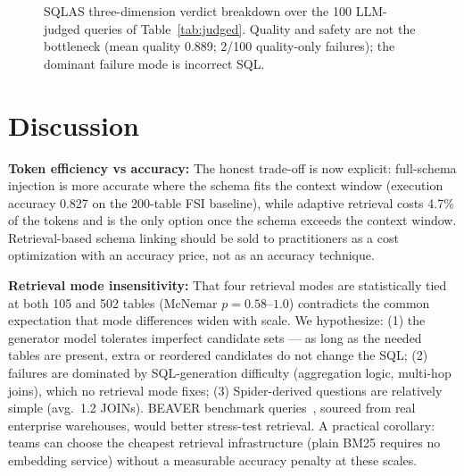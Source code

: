\documentclass[conference]{IEEEtran}
\begin{document}
\begin{figure}[!htb]
\centering
{}
\caption{SQLAS three-dimension verdict breakdown over the 100
LLM-judged queries of Table~\ref{tab:judged}. Quality and safety are
not the bottleneck (mean quality 0.889; 2/100 quality-only failures);
the dominant failure mode is incorrect SQL.}
\label{fig:verdict}
\end{figure}

\section{Discussion}
\label{sec:discussion}

\textbf{Token efficiency vs accuracy:}
The honest trade-off is now explicit: full-schema injection is more
accurate where the schema fits the context window (execution accuracy
0.827 on the 200-table FSI baseline), while adaptive retrieval costs
4.7\% of the tokens and is the only option once the schema exceeds the
context window. Retrieval-based schema linking should be sold to
practitioners as a cost optimization with an accuracy price, not as an
accuracy technique.

\textbf{Retrieval mode insensitivity:}
That four retrieval modes are statistically tied at both 105 and 502
tables (McNemar $p = 0.58$--$1.0$) contradicts the common expectation
that mode differences widen with scale. We hypothesize: (1) the
generator model tolerates imperfect candidate sets --- as long as the
needed tables are present, extra or reordered candidates do not change
the SQL; (2) failures are dominated by SQL-generation difficulty
(aggregation logic, multi-hop joins), which no retrieval mode fixes;
(3) Spider-derived questions are relatively simple (avg.\ 1.2 JOINs).
BEAVER benchmark queries~\cite{beaver}, sourced from real enterprise
warehouses, would better stress-test retrieval. A practical corollary:
teams can choose the cheapest retrieval infrastructure (plain BM25
requires no embedding service) without a measurable accuracy penalty
at these scales.
\end{document}
